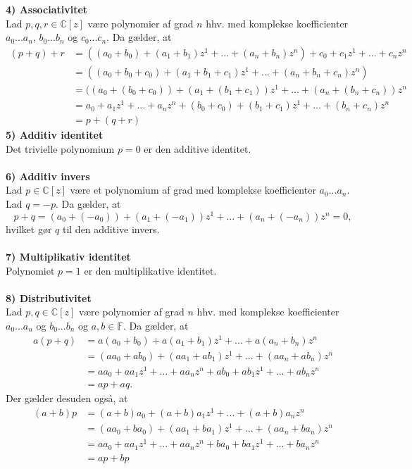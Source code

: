 \documentclass[12pt,a4paper]{report}
\begin{document}
\textbf{4) Associativitet}\\
Lad $p,q,r \in \mathbb{C}[z]$ være polynomier af grad $n$ hhv. med komplekse koefficienter $a_0...a_n$, $b_0...b_n$ og $c_0...c_n$. Da gælder, at
\begin{align*}
(p+q)+r & =((a_0+b_0)+(a_1+b_1)z^1+...+(a_n+b_n)z^n)+c_0+c_1z^1+...+c_nz^n \\
& =((a_0+b_0+c_0)+(a_1+b_1+c_1)z^1+...+(a_n+b_n+c_n)z^n)\\
& =((a_0+(b_0+c_0))+(a_1+(b_1+c_1))z^1+...+(a_n+(b_n+c_n))z^n\\
& =a_0+a_1z^1+...+a_nz^n+(b_0+c_0)+(b_1+c_1)z^1+...+(b_n+c_n)z^n\\
& = p+(q+r)
\end{align*}
\textbf{5) Additiv identitet}\\
Det trivielle polynomium $p=0$ er den additive identitet.\\\\
\textbf{6) Additiv invers}\\
Lad $p \in \mathbb{C}[z]$ være et polynomium af grad med komplekse koefficienter $a_0...a_n$. Lad $q=-p$. Da gælder, at
\begin{equation}
p+q=(a_0+(-a_0))+(a_1+(-a_1))z^1+...+(a_n+(-a_n))z^n=0,
\end{equation}
hvilket gør $q$ til den additive invers.\\\\
\textbf{7) Multiplikativ identitet}\\
Polynomiet $p=1$ er den multiplikative identitet.\\\\
\textbf{8) Distributivitet}\\
Lad $p,q \in \mathbb{C}[z]$ være polynomier af grad $n$ hhv. med komplekse koefficienter $a_0...a_n$ og $b_0...b_n$ og $a,b \in \mathbb{F}$. Da gælder, at
\begin{align*}
a(p+q) & =a(a_0+b_0)+a(a_1+b_1)z^1+...+a(a_n+b_n)z^n \\
& =(aa_0+ab_0)+(aa_1+ab_1)z^1+...+(aa_n+ab_n)z^n \\
& =aa_0+aa_1z^1+...+aa_nz^n+ab_0+ab_1z^1+...+ab_nz^n \\
& =ap+aq.
\end{align*}
Der gælder desuden også, at
\begin{align*}
(a+b)p & =(a+b)a_0+(a+b)a_1z^1+...+(a+b)a_nz^n \\
& =(aa_0+ba_0)+(aa_1+ba_1)z^1+...+(aa_n+ba_n)z^n \\
& =aa_0+aa_1z^1+...+aa_nz^n+ba_0+ba_1z^1+...+ba_nz^n \\
& = ap+bp
\end{align*}
\end{document}
